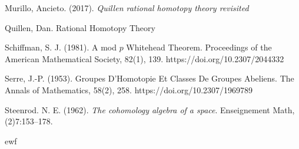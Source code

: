 \documentclass[psamsfonts]{amsart}
\theoremstyle{definition}
\theoremstyle{remark}
\numberwithin{equation}{section}
\begin{document}
\begin{thebibliography}{2}
 Murillo, Ancieto. (2017). \textit{Quillen rational homotopy theory revisited}

 Quillen, Dan. Rational Homotopy Theory

Schiffman, S. J. (1981). A mod $p$ Whitehead Theorem. Proceedings of the American Mathematical Society, 82(1), 139. https://doi.org/10.2307/2044332 

Serre, J.-P. (1953). Groupes D'Homotopie Et Classes De Groupes Abeliens. The Annals of Mathematics, 58(2), 258. https://doi.org/10.2307/1969789 

Steenrod. N. E. (1962). \textit{The cohomology algebra of a space}. Enseignement Math, (2)7:153–178.

 ewf

\end{thebibliography}
\end{document}
